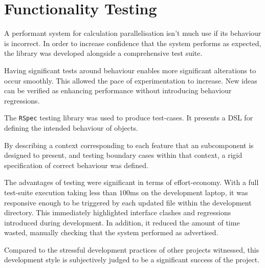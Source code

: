 \section{Functionality Testing}
A performant system for calculation parallelisation isn't much use if its behaviour is incorrect. In order to increase confidence that the system performs as expected, the library was developed alongside a comprehensive test suite.

Having significant tests around behaviour enables more significant alterations to occur smoothly. This allowed the pace of experimentation to increase. New ideas can be verified as enhancing performance without introducing behaviour regressions.

The \verb|RSpec|\cite{rspec} testing library was used to produce test-cases. It presents a \ac{DSL} for defining the intended behaviour of objects.

By describing a context corresponding to each feature that an subcomponent is designed to present, and testing boundary cases within that context, a rigid specification of correct behaviour was defined.

The advantages of testing were significant in terms of effort-economy. With a full test-suite execution taking less than $100$ms on the development laptop, it was responsive enough to be triggered by each updated file within the development directory. This immediately highlighted interface clashes and regressions introduced during development. In addition, it reduced the amount of time wasted, manually checking that the system performed as advertised.

Compared to the stressful development practices of other projects witnessed, this development style is subjectively judged to be a significant success of the project.
